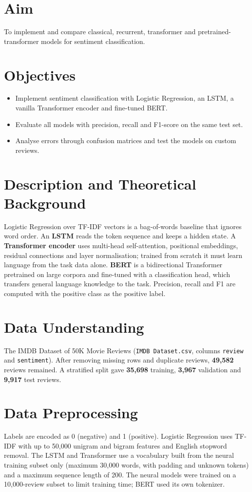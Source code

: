 \documentclass[12pt,a4paper,oneside]{report}
\begin{document}
\section{Aim}
To implement and compare classical, recurrent, transformer and pretrained-transformer models for sentiment classification.


\section{Objectives}
\begin{itemize}
\item Implement sentiment classification with Logistic Regression, an LSTM, a vanilla Transformer encoder and fine-tuned BERT.
\item Evaluate all models with precision, recall and F1-score on the same test set.
\item Analyse errors through confusion matrices and test the models on custom reviews.
\end{itemize}

\section{Description and Theoretical Background}
Logistic Regression over TF-IDF vectors is a bag-of-words baseline that ignores word order. An \textbf{LSTM} reads the token sequence and keeps a hidden state. A \textbf{Transformer encoder} uses multi-head self-attention, positional embeddings, residual connections and layer normalisation; trained from scratch it must learn language from the task data alone. \textbf{BERT} is a bidirectional Transformer pretrained on large corpora and fine-tuned with a classification head, which transfers general language knowledge to the task. Precision, recall and F1 are computed with the positive class as the positive label.


\section{Data Understanding}
The IMDB Dataset of 50K Movie Reviews (\texttt{IMDB\ Dataset.csv}, columns \texttt{review} and \texttt{sentiment}). After removing missing rows and duplicate reviews, \textbf{49,582} reviews remained. A stratified split gave \textbf{35,698} training, \textbf{3,967} validation and \textbf{9,917} test reviews.


\section{Data Preprocessing}
Labels are encoded as 0 (negative) and 1 (positive). Logistic Regression uses TF-IDF with up to 50,000 unigram and bigram features and English stopword removal. The LSTM and Transformer use a vocabulary built from the neural training subset only (maximum 30,000 words, with padding and unknown tokens) and a maximum sequence length of 200. The neural models were trained on a 10,000-review subset to limit training time; BERT used its own tokenizer.
\end{document}
